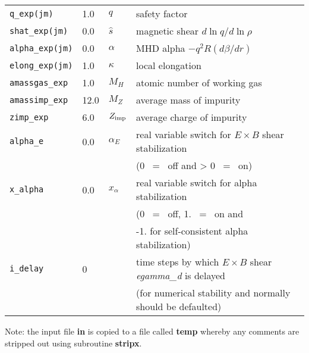 \begin{center}
\begin{tabular}{lllp{4.5in}}
{\tt q\_exp(jm)}       & 1.0 & $q$ & safety factor \\
{\tt shat\_exp(jm)}    & 0.0 & $\hat{s}$ & magnetic shear $ d \ln q / d \ln \rho $ \\
{\tt alpha\_exp(jm)}   & 0.0 & $\alpha$ & MHD alpha $ -q^2 R (d\beta/dr) $\\
{\tt elong\_exp(jm)}   & 1.0 & $\kappa$ & local elongation \\
{\tt amassgas\_exp}    & 1.0 & $M_H$ & atomic number of working gas \\
{\tt amassimp\_exp}    & 12.0 & $M_Z$ & average mass of impurity\\
{\tt zimp\_exp}        & 6.0 & $Z_{\rm imp}$ & average charge of impurity\\
{\tt alpha\_e}         & 0.0 & $\alpha_E$ & real variable switch for $E\times B$ shear stabilization \\
                       &     &   & (0 \ = \ off and > 0 \ = \ on) \\
{\tt x\_alpha}         & 0.0 & $x_{\alpha}$ & real variable switch for alpha stabilization \\
                       &     &  & (0 \ = \ off, 1. \ = \ on and\\
                       &     &  & -1. for self-consistent alpha stabilization) \\
{\tt i\_delay}         &  0  &  & time steps by which $E\times B$ shear {\it egamma\_d} is  delayed\\
                       &     &  &  (for numerical stability and normally should be defaulted) \\ 
\end{tabular}
\end{center}

\noindent
Note: the input file {\bf in} is copied to a file called {\bf temp} whereby
any comments are stripped out using subroutine {\bf stripx}.

\newpage

